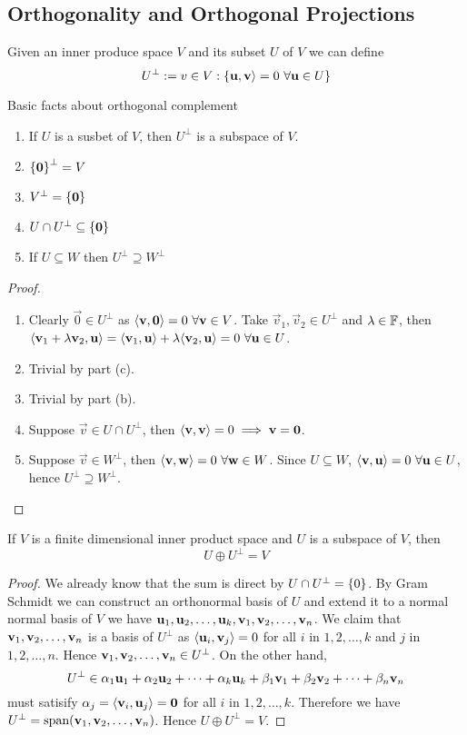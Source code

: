 \subsection{Orthogonality and Orthogonal Projections}
\begin{definition}
    Given an inner produce space $V$ and its subset $U$ of $V$ we can define 
    \[ U^\perp := \mathbb {\mathbf} v \in V : \left\{ \mathbf u , \mathbf v \rangle = 0 \ \forall \mathbf u \in U \right\} \]
\end{definition}
\begin{theorem}
Basic facts about orthogonal complement
\begin{enumerate}[label = (\alph*)]
    \item If $U$ is a susbet of $V$, then $U^\perp$ is a subspace of $V$.
    \item $\left\{ \mathbf 0 \right\}^\perp = V$
    \item $V^\perp = \left\{ \mathbf 0 \right\}$
    \item $U \cap U^\perp \subseteq \left\{ \mathbf 0 \right\}$ 
    \item If $U \subseteq W$ then $U^\perp \supseteq W^\perp$
\end{enumerate}
\end{theorem}
\begin{proof} $ $
\begin{enumerate}[label = (\alph*)] 
    \item Clearly $\vec 0 \in U^\perp$ as $\langle \mathbf v, \mathbf 0 \rangle = 0 \ \forall \mathbf v \in V$. Take $\vec v_1, \vec v_2 \in U^\perp$ and $\lambda \in \mathbb F$, then $\langle \mathbf v_1 + \lambda \mathbf v_2, \mathbf u \rangle = \langle \mathbf v_1, \mathbf u \rangle + \lambda \langle \mathbf v_2, \mathbf u \rangle = 0 \ \forall \mathbf u \in U$.
    \item Trivial by part (c).
    \item Trivial by part (b).
    \item Suppose $\vec v \in U \cap U^\perp$, then $\langle \mathbf v, \mathbf v \rangle = 0 \implies \mathbf v = \mathbf 0$.
    \item Suppose $\vec v \in W^\perp$, then $\langle \mathbf v, \mathbf w \rangle = 0 \ \forall \mathbf w \in W$. Since $U \subseteq W$, $\langle \mathbf v, \mathbf u \rangle = 0 \ \forall \mathbf u \in U$, hence $U^\perp \supseteq W^\perp$.
\end{enumerate}
\end{proof}
\begin{theorem}
    If $V$ is a finite dimensional inner product space and $U$ is a subspace of $V$, then \[U \oplus U^\perp = V\]
\end{theorem}
\begin{proof}
    We already know that the sum is direct by $U \cap U^\perp = \left\{ 0 \right\}$.  By Gram Schmidt we can construct an orthonormal basis of $U$ and extend it to a normal normal basis of $V$ we have ${\mathbf u}_1,{\mathbf u}_2, \ldots, {\mathbf u}_{k}, {\mathbf v}_1,{\mathbf v}_2, \ldots, {\mathbf v}_{n}$. We claim that ${\mathbf v}_1,{\mathbf v}_2, \ldots, {\mathbf v}_{n}$ is a basis of $U^\perp$ as $\langle \mathbf u_i, \mathbf v_j \rangle = 0$ for all $i$ in $1,2, \ldots, k$ and $j$ in $1,2, \ldots, n$. Hence ${\mathbf v}_1,{\mathbf v}_2, \ldots, {\mathbf v}_{n} \in U^\perp$. On the other hand, 
    \[ U^\perp \in {\alpha}_1{\mathbf u}_1 + {\alpha}_2{\mathbf u}_2 + \cdots + {\alpha}_{k}{\mathbf u}_{k} + {\beta}_1{\mathbf v}_1 + {\beta}_2{\mathbf v}_2 + \cdots + {\beta}_{n}{\mathbf v}_{n} \]
    must satisify $\alpha_j = \langle \mathbf v_i, \mathbf u_j \rangle = \mathbf 0$ for all $i$ in $1,2, \ldots, k$. Therefore we have $U^\perp = \text{span} ({\mathbf v}_1,{\mathbf v}_2, \ldots, {\mathbf v}_{n})$. Hence $U \oplus U^\perp = V$.
\end{proof}
